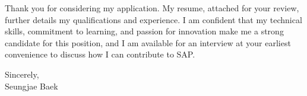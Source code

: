 \documentclass[letterpaper,11pt]{article}
\begin{document}
Thank you for considering my application. My resume, attached for your review, further details my qualifications and experience. I am confident that my technical skills, commitment to learning, and passion for innovation make me a strong candidate for this position, and I am available for an interview at your earliest convenience to discuss how I can contribute to SAP.
\vspace{20pt}

Sincerely,\\
\vspace{40pt} %
Seungjae Baek

\end{document}
